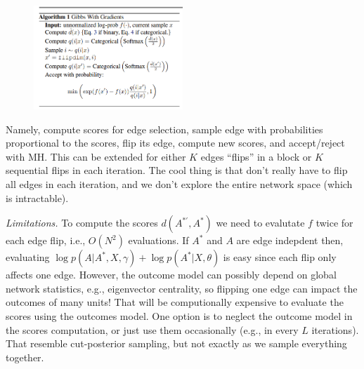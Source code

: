 \documentclass[12pt]{article}
\begin{document}
\begin{enumerate}
            \begin{figure}[!ht]
                \centering
                \includegraphics[width=0.5\textwidth]{gwg.png}
            \end{figure}

            Namely, compute scores for edge selection, sample edge with probabilities
            proportional to the scores, flip its edge, compute new scores,
             and accept/reject with MH. 
             This can be extended for either $K$ edges ``flips'' in a block 
             or $K$ sequential flips in each iteration. 
             The cool thing is that don't really have to flip all edges
             in each iteration, and we don't explore the entire network space (which is intractable).

            \textit{Limitations.} To compute the scores $d(A^{\ast'},A^\ast)$ 
            we need to evalutate $f$ twice for each edge flip, i.e., $O(N^2)$ evaluations.
            If $A^\ast$ and $A$ are edge indepdent then, evaluating 
            $\log p(A \vert A^\ast, X,\gamma) + \log p(A^\ast \vert X,\theta)$ is easy
            since each flip only affects one edge. 
            However, the outcome model can possibly depend on global network statistics,
            e.g., eigenvector centrality, so flipping one edge can impact the outcomes of many units!
            That will be computionally expensive to evaluate the scores using the outcomes model.
            One option is to neglect the outcome model in the scores computation, 
            or just use them occasionally (e.g., in every $L$ iterations). 
            That resemble cut-posterior sampling, but not exactly as we sample everything together.

        \end{enumerate}

    
\end{document}
